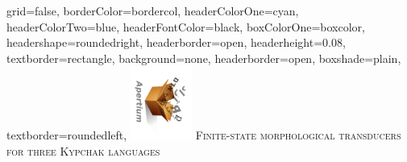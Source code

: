 \documentclass[a0paper,fontscale=0.3]{baposter}  %
\begin{document}
	\setlength{\pdfpageheight}{\paperheight}
	\setlength{\pdfpagewidth}{\paperwidth}

	\background{{
	}}



	\begin{poster}{
			grid=false,
			borderColor=bordercol,
			headerColorOne=cyan,
			headerColorTwo=blue,
			headerFontColor=black,
			boxColorOne=boxcolor,
			headershape=roundedright,
  headerborder=open,
  headerheight=0.08\textheight,
			textborder=rectangle,
			background=none,
			headerborder=open,
			boxshade=plain,
			textborder=roundedleft,
		}{
			\hspace{-2em}\includegraphics[angle=90,height=6.5em,bb=0 0 203 242]{apertium5a}
		}{
			{\vspace{0pt}\hspace{-2.2ex}
			{\titlefont \textsc{Finite-state morphological transducers\\for three Kypchak languages}}}
		}{

}
\end{poster}
\end{document}
